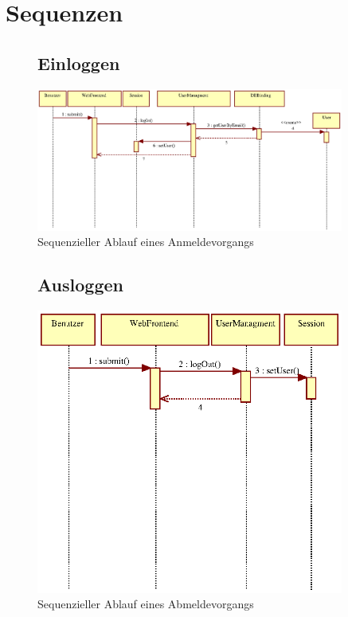 \documentclass[a4paper,11pt]{scrartcl}
\begin{document}
\section{Sequenzen}
\begin{figure}[h]
\subsection{Einloggen}
		\centering
		\includegraphics[width=0.90\textwidth]{images/seq01_einloggen.eps}
		\caption{Sequenzieller Ablauf eines Anmeldevorgangs}
		\label{seq01}
\end{figure}

\begin{figure}[h]
\subsection{Ausloggen}
		\centering
		\includegraphics[width=0.90\textwidth]{images/seq02_ausloggen.eps}
		\caption{Sequenzieller Ablauf eines Abmeldevorgangs}
		\label{seq02}
\end{figure}
\end{document}
